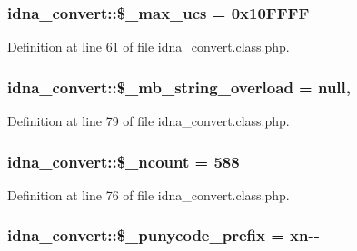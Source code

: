 \subsubsection[{\$\+\_\+max\+\_\+ucs}]{\setlength{\rightskip}{0pt plus 5cm}idna\+\_\+convert\+::\$\+\_\+max\+\_\+ucs = 0x10\+F\+F\+F\+F\hspace{0.3cm}{\ttfamily [protected]}}\label{classidna__convert_aea20377d4d2659186a1901d6a66f5d58}


Definition at line 61 of file idna\+\_\+convert.\+class.\+php.

\hypertarget{classidna__convert_a36aba0d7717782343396a25026107dc7}{}
\subsubsection[{\$\+\_\+mb\+\_\+string\+\_\+overload}]{\setlength{\rightskip}{0pt plus 5cm}idna\+\_\+convert\+::\$\+\_\+mb\+\_\+string\+\_\+overload = null\hspace{0.3cm}{\ttfamily [static]}, {\ttfamily [protected]}}\label{classidna__convert_a36aba0d7717782343396a25026107dc7}


Definition at line 79 of file idna\+\_\+convert.\+class.\+php.

\hypertarget{classidna__convert_a0e6408f36ff8f150adb9d1a67c7fe3e2}{}
\subsubsection[{\$\+\_\+ncount}]{\setlength{\rightskip}{0pt plus 5cm}idna\+\_\+convert\+::\$\+\_\+ncount = 588\hspace{0.3cm}{\ttfamily [protected]}}\label{classidna__convert_a0e6408f36ff8f150adb9d1a67c7fe3e2}


Definition at line 76 of file idna\+\_\+convert.\+class.\+php.

\hypertarget{classidna__convert_a314677b13ded35e088abec26ef7c8be8}{}
\subsubsection[{\$\+\_\+punycode\+\_\+prefix}]{\setlength{\rightskip}{0pt plus 5cm}idna\+\_\+convert\+::\$\+\_\+punycode\+\_\+prefix = \textquotesingle{}xn-\/-\/\textquotesingle{}\hspace{0.3cm}{\ttfamily [protected]}}\label{classidna__convert_a314677b13ded35e088abec26ef7c8be8}


